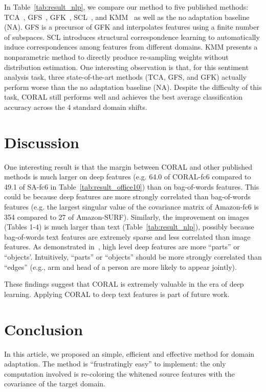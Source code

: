 \documentclass[letterpaper]{article}
\begin{document}
In Table~\ref{tab:result_nlp}, we compare our method to five 
published methods: TCA~\cite{tca}, GFS~\cite{gopalan-iccv11}, GFK~\cite{gfk}, SCL~\cite{scl}, and KMM~\cite{huang_nips06} as well as the no adaptation baseline (NA). GFS is a precursor of GFK and interpolates features using a finite number of subspaces. SCL introduces structural correspondence learning to automatically induce correspondences among features from different domains. KMM presents a nonparametric method to directly produce re-sampling weights without distribution estimation. One interesting observation is that, for this sentiment analysis task, three state-of-the-art methods (TCA, GFS, and GFK) actually perform worse than the no adaptation baseline (NA). Despite the difficulty of this task, CORAL still performs well and achieves the best average classification accuracy across the 4 standard domain shifts.

\section{Discussion}
One interesting result is that the margin between CORAL and other published methods is much larger on deep features (e.g. 64.0 of CORAL-fc6 compared to 49.1 of SA-fc6 in Table~\ref{tab:result_office10}) than on bag-of-words features. This could be because deep features are more strongly correlated than bag-of-words features (e.g. the largest singular value of the covariance matrix of Amazon-fc6 is 354 compared to 27 of Amazon-SURF). Similarly, the improvement on images (Tables 1-4) is much larger than text (Table~\ref{tab:result_nlp}), possibly because bag-of-words text features are extremely sparse and less correlated than image features.
As demonstrated in~\cite{deep_vis}, high level deep features are more ``parts'' or ``objects'. Intuitively, ``parts'' or ``objects'' should be more strongly correlated than ``edges'' (e.g., arm and head of a person are more likely to appear jointly).

These findings suggest that CORAL is extremely valuable in the era of deep learning. Applying CORAL to deep text features is part of future work.
\section{Conclusion}
\label{sec:concl}
In this article, we proposed an simple, efficient and effective method for domain adaptation. The method is ``frustratingly easy'' to implement: the only computation involved is re-coloring the whitened source features with the covariance of the target domain. 
\end{document}
